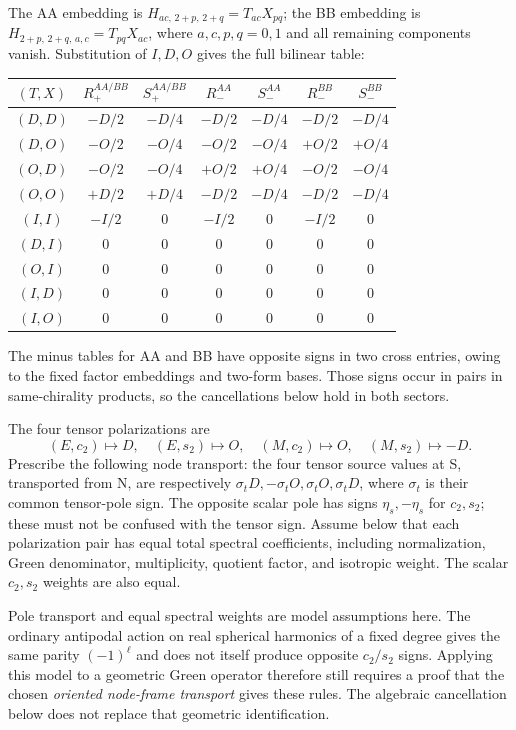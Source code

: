 \documentclass[a4paper,11pt]{article}
\numberwithin{equation}{section}
\theoremstyle{definition}
\begin{document}
The AA embedding is $H_{ac,\,2+p,\,2+q}=T_{ac}X_{pq}$;
the BB embedding is $H_{2+p,\,2+q,\,a,c}=T_{pq}X_{ac}$, where $a,c,p,q=0,1$ and all remaining components vanish.
Substitution of $I,D,O$ gives the full bilinear table:
\begin{center}
\small
\begin{tabular}{c c c c c c c}
\toprule
$(T,X)$ & $R_+^{AA/BB}$ & $S_+^{AA/BB}$ & $R_-^{AA}$ & $S_-^{AA}$ & $R_-^{BB}$ & $S_-^{BB}$\\\midrule
$(D,D)$ & $-D/2$ & $-D/4$ & $-D/2$ & $-D/4$ & $-D/2$ & $-D/4$\\
$(D,O)$ & $-O/2$ & $-O/4$ & $-O/2$ & $-O/4$ & $+O/2$ & $+O/4$\\
$(O,D)$ & $-O/2$ & $-O/4$ & $+O/2$ & $+O/4$ & $-O/2$ & $-O/4$\\
$(O,O)$ & $+D/2$ & $+D/4$ & $-D/2$ & $-D/4$ & $-D/2$ & $-D/4$\\
$(I,I)$ & $-I/2$ & $0$ & $-I/2$ & $0$ & $-I/2$ & $0$\\
$(D,I)$ & $0$ & $0$ & $0$ & $0$ & $0$ & $0$\\
$(O,I)$ & $0$ & $0$ & $0$ & $0$ & $0$ & $0$\\
$(I,D)$ & $0$ & $0$ & $0$ & $0$ & $0$ & $0$\\
$(I,O)$ & $0$ & $0$ & $0$ & $0$ & $0$ & $0$\\\bottomrule
\end{tabular}
\end{center}
The minus tables for AA and BB have opposite signs in two cross entries, owing to the fixed factor embeddings and two-form bases. Those signs occur in pairs in same-chirality products, so the cancellations below hold in both sectors.

The four tensor polarizations are
\[
(E,c_2)\mapsto D,\quad(E,s_2)\mapsto O,\quad
(M,c_2)\mapsto O,\quad(M,s_2)\mapsto-D.
\]
Prescribe the following node transport: the four tensor source values at S, transported from N, are respectively
$\sigma_tD,-\sigma_tO,\sigma_tO,\sigma_tD$, where $\sigma_t$ is their common tensor-pole sign. The opposite scalar pole has signs $\eta_s,-\eta_s$ for $c_2,s_2$; these must not be confused with the tensor sign. Assume below that each polarization pair has equal total spectral coefficients, including normalization, Green denominator, multiplicity, quotient factor, and isotropic weight. The scalar $c_2,s_2$ weights are also equal.

Pole transport and equal spectral weights are model assumptions here. The ordinary antipodal action on real spherical harmonics of a fixed degree gives the same parity $(-1)^\ell$ and does not itself produce opposite $c_2/s_2$ signs. Applying this model to a geometric Green operator therefore still requires a proof that the chosen \emph{oriented node-frame transport} gives these rules. The algebraic cancellation below does not replace that geometric identification.
\end{document}
